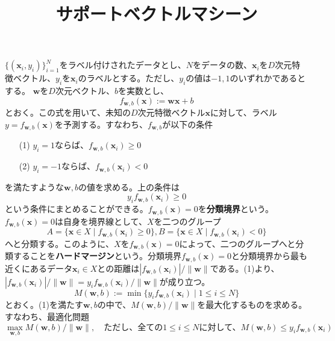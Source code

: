 \documentclass{jsarticle}
\theoremstyle{definition}
\begin{document}
\title{サポートベクトルマシーン}
\date{}
\maketitle
$\{(\mathbf{x}_{i},y_{i})\}_{i=1}^{N}$をラベル付けされたデータとし、$N$をデータの数、$\mathbf{x}_{i}$を$D$次元特徴ベクトル、$y_{i}$を$\mathbf{x}_{i}$のラベルとする。ただし、$y_{i}$の値は$-1,1$のいずれかであるとする。
$\mathbf{w}$を$D$次元ベクトル、$b$を実数とし、
\begin{equation*}
f_{\mathbf{w},b}(\mathbf{x}):=\mathbf{w}\mathbf{x}+b
\end{equation*}
とおく。この式を用いて、未知の$D$次元特徴ベクトル$\mathbf{x}$に対して、ラベル$y=f_{\mathbf{w},b}(\mathbf{x})$を予測する。すなわち、$f_{\mathbf{w},b}$が以下の条件
\begin{enumerate}
\item[(1)] $y_{i}=1$ならば、$f_{\mathbf{w},b}(\mathbf{x}_{i})\geq 0$
\item[(2)] $y_{i}=-1$ならば、$f_{\mathbf{w},b}(\mathbf{x}_{i})< 0$
\end{enumerate}
を満たすような$\mathbf{w},b$の値を求める。上の条件は
\begin{equation}
y_{i}f_{\mathbf{w},b}(\mathbf{x}_{i})\geq 0
\end{equation}
という条件にまとめることができる。$f_{\mathbf{w},b}(\mathbf{x})=0$を\textbf{分類境界}という。$f_{\mathbf{w},b}(\mathbf{x})=0$は自身を境界線として、$X$を二つのグループ
\begin{equation*}
A=\{\mathbf{x}\in X\mid f_{\mathbf{w},b}(\mathbf{x}_{i})\geq 0\},B=\{\mathbf{x}\in X\mid f_{\mathbf{w},b}(\mathbf{x}_{i})< 0\}
\end{equation*}
へと分類する。このように、$X$を$f_{\mathbf{w},b}(\mathbf{x})=0$によって、二つのグループへと分類することを\textbf{ハードマージン}という。分類境界$f_{\mathbf{w},b}(\mathbf{x})=0$と分類境界から最も近くにあるデータ$\mathbf{x}_{i}\in X$との距離は$|f_{\mathbf{w},b}(\mathbf{x}_{i})|/\|\mathbf{w}\|$である。(1)より、
$|f_{\mathbf{w},b}(\mathbf{x}_{i})|/\|\mathbf{w}\|=y_{i}f_{\mathbf{w},b}(\mathbf{x}_{i})/\|\mathbf{w}\|$が成り立つ。
\begin{equation*}
M(\mathbf{w},b):=\min\{y_{i}f_{\mathbf{w},b}(\mathbf{x}_{i})\mid 1\leq i\leq N\}
\end{equation*}
とおく。(1)を満たす$\mathbf{w},b$の中で、$M(\mathbf{w},b)/\|\mathbf{w}\|$を最大化するものを求める。
すなわち、最適化問題
\begin{equation}
\max_{\mathbf{w},b}M(\mathbf{w},b)/\|\mathbf{w}\|,\quad \text{ただし、全ての$1\leq i\leq N$に対して、$M(\mathbf{w},b)\leq y_{i}f_{\mathbf{w},b}(\mathbf{x}_{i})$}
\end{equation}
\end{document}
